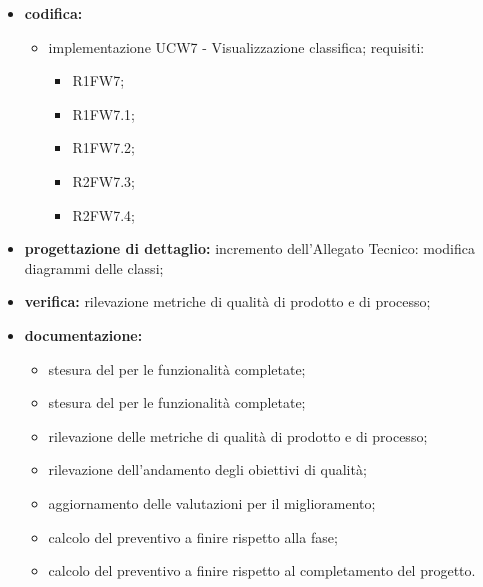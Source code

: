 \begin{itemize}
	\item \textbf{codifica:} 
			\begin{itemize}
				\item implementazione UCW7 - Visualizzazione classifica; requisiti:
					\begin{itemize}
						\item R1FW7;
						\item R1FW7.1;
						\item R1FW7.2;
						\item R2FW7.3;
						\item R2FW7.4;
					\end{itemize}
			\end{itemize}
	\item \textbf{progettazione di dettaglio:} incremento dell’Allegato Tecnico: modifica diagrammi delle classi;
 	\item \textbf{verifica:} rilevazione metriche di qualità di prodotto e di processo;
	\item \textbf{documentazione:} 
	 \begin{itemize}
		\item stesura del \MU{} per le funzionalità completate;
		\item stesura del \MS{} per le funzionalità completate;
     	\item rilevazione delle metriche di qualità di prodotto e di processo;
     	\item rilevazione dell’andamento degli obiettivi di qualità;
		\item aggiornamento delle valutazioni per il miglioramento; 
		\item calcolo del preventivo a finire rispetto alla fase;
		\item calcolo del preventivo a finire rispetto al completamento del progetto.
	 \end{itemize}
\end{itemize}

\pagebreak

